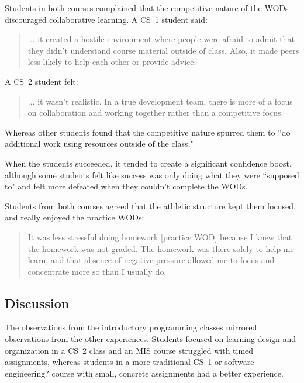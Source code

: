 Students in both courses complained that the competitive nature of the WODs discouraged collaborative learning. A CS~1 student said:

\begin{quote}
... it created a hostile environment where people were afraid to admit that they didn't understand course material outside of class. Also, it made peers less likely to help each other or provide advice.
\end{quote}

A CS~2 student felt:

\begin{quote}
... it wasn't realistic. In a true development team, there is more of a focus on collaboration and working together rather than a competitive focus.
\end{quote}

Whereas other students found that the competitive nature spurred them to ``do additional work using resources outside of the class."

When the students succeeded, it tended to create a significant confidence boost, although some students felt like success was only doing what they were ``supposed to" and felt more defeated when they couldn't complete the WODs.

Students from both courses agreed that the athletic structure kept them focused, and really enjoyed the practice WODs:

\begin{quote}
It was less stressful doing homework [practice WOD] because I knew that the homework was not graded. The homework was there solely to help me learn, and that absence of negative pressure allowed me to focus and concentrate more so than I usually do.
\end{quote}

\subsection{Discussion}

The observations from the introductory programming classes mirrored observations from the other experiences. Students focused on learning design and organization in a CS~2 class and an MIS course struggled with timed assignments, whereas students in a more traditional CS~1 or software engineering? course with small, concrete assignments had a better experience. 
